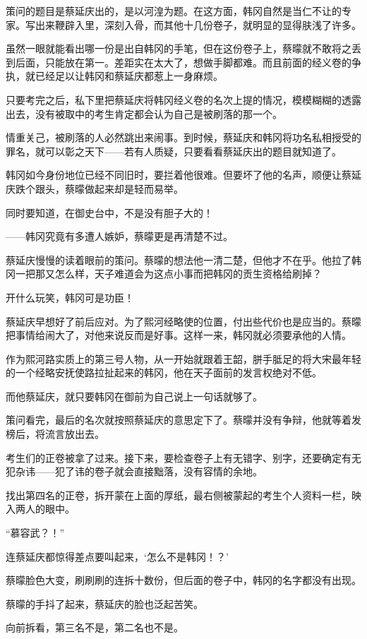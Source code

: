 策问的题目是蔡延庆出的，是以河湟为题。在这方面，韩冈自然是当仁不让的专家。写出来鞭辟入里，深刻入骨，而其他十几份卷子，就明显的显得肤浅了许多。

虽然一眼就能看出哪一份是出自韩冈的手笔，但在这份卷子上，蔡曚就不敢将之丢到后面，只能放在第一。差距实在太大了，想做手脚都难。而且前面的经义卷的争执，就已经足以让韩冈和蔡延庆都惹上一身麻烦。

只要考完之后，私下里把蔡延庆将韩冈经义卷的名次上提的情况，模模糊糊的透露出去，没有被取中的考生肯定都会认为自己是被刷落的那一个。

情重关己，被刷落的人必然跳出来闹事。到时候，蔡延庆和韩冈将功名私相授受的罪名，就可以彰之天下——若有人质疑，只要看看蔡延庆出的题目就知道了。

韩冈如今身份地位已经不同旧时，要拦着他很难。但要坏了他的名声，顺便让蔡延庆跌个跟头，蔡曚做起来却是轻而易举。

同时要知道，在御史台中，不是没有胆子大的！

——韩冈究竟有多遭人嫉妒，蔡曚更是再清楚不过。

蔡延庆慢慢的读着眼前的策问。蔡曚的想法他一清二楚，但他才不在乎。他拉了韩冈一把那又怎么样，天子难道会为这点小事而把韩冈的贡生资格给刷掉？

开什么玩笑，韩冈可是功臣！

蔡延庆早想好了前后应对。为了熙河经略使的位置，付出些代价也是应当的。蔡曚把事情给闹大了，对他来说反而是好事。这样一来，韩冈就必须要承他的人情。

作为熙河路实质上的第三号人物，从一开始就跟着王韶，胼手胝足的将大宋最年轻的一个经略安抚使路拉扯起来的韩冈，他在天子面前的发言权绝对不低。

而他蔡延庆，就只要韩冈在御前为自己说上一句话就够了。

策问看完，最后的名次就按照蔡延庆的意思定下了。蔡曚并没有争辩，他就等着发榜后，将流言放出去。

考生们的正卷被拿了过来。接下来，要检查卷子上有无错字、别字，还要确定有无犯杂讳——犯了讳的卷子就会直接黜落，没有容情的余地。

找出第四名的正卷，拆开蒙在上面的厚纸，最右侧被蒙起的考生个人资料一栏，映入两人的眼中。

“慕容武？！”

连蔡延庆都惊得差点要叫起来，‘怎么不是韩冈！？’

蔡曚脸色大变，刷刷刷的连拆十数份，但后面的卷子中，韩冈的名字都没有出现。

蔡曚的手抖了起来，蔡延庆的脸也泛起苦笑。

向前拆看，第三名不是，第二名也不是。

